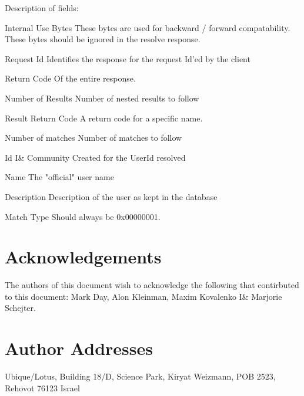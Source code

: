 \documentclass[titlepage,oneside]{book}
\begin{document}
Description of fields:

Internal Use Bytes
  These bytes are used for backward / forward compatability. These
  bytes should be ignored in the resolve response.

Request Id
  Identifies the response for the request Id'ed by the client

Return Code
  Of the entire response.

Number of Results
  Number of nested results to follow

Result Return Code
  A return code for a specific name.

Number of matches
  Number of matches to follow

Id I\& Community
  Created for the UserId resolved

Name
  The "official" user name

Description
  Description of the user as kept in the database

Match Type Should always be 0x00000001.

\chapter{Acknowledgements}

\par{} The authors of this document wish to acknowledge the following
that contirbuted to this document: Mark Day, Alon Kleinman, Maxim
Kovalenko I\& Marjorie Schejter.

\chapter{Author Addresses}

\par {} Ubique/Lotus, Building 18/D, Science Park, Kiryat Weizmann,
POB 2523, Rehovot 76123 Israel
\end{document}
